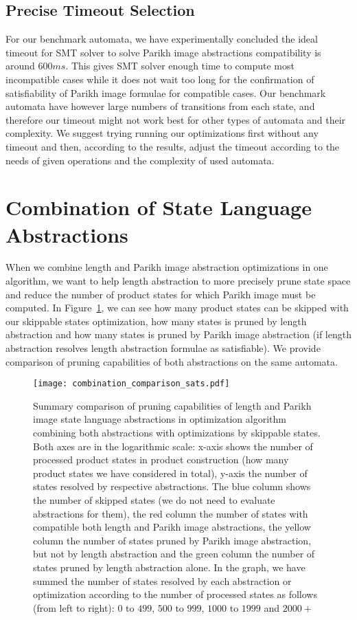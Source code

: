 \subsection{Precise Timeout Selection}

For our benchmark automata, we have experimentally concluded the ideal timeout for SMT solver to solve Parikh image abstractions compatibility is around $600 ms$. This gives SMT solver enough time to compute most incompatible cases while it does not wait too long for the confirmation of satisfiability of Parikh image formulae for compatible cases. Our benchmark automata have however large numbers of transitions from each state, and therefore our timeout might not work best for other types of automata and their complexity. We suggest trying running our optimizations first without any timeout and then, according to the results, adjust the timeout according to the needs of given operations and the complexity of used automata.

\section{Combination of State Language Abstractions}

When we combine length and Parikh image abstraction optimizations in one algorithm, we want to help length abstraction to more precisely prune state space and reduce the number of product states for which Parikh image must be computed. In Figure~\ref{fig:diagram:combined_sat_unsat_comparison}, we can see how many product states can be skipped with our skippable states optimization, how many states is pruned by length abstraction and how many states is pruned by Parikh image abstraction (if length abstraction resolves length abstraction formulae as satisfiable). We provide comparison of pruning capabilities of both abstractions on the same automata.

\begin{figure}[ht]
	\centering
	\texttt{[image: combination\_comparison\_sats.pdf]}
	\caption{Summary comparison of pruning capabilities of length and Parikh image state language abstractions in optimization algorithm combining both abstractions with optimizations by skippable states. Both axes are in the logarithmic scale: x-axis shows the number of processed product states in product construction (how many product states we have considered in total), y-axis the number of states resolved by respective abstractions. The blue column shows the number of skipped states (we do not need to evaluate abstractions for them), the red column the number of states with compatible both length and Parikh image abstractions, the yellow column the number of states pruned by Parikh image abstraction, but not by length abstraction and the green column the number of states pruned by length abstraction alone. In the graph, we have summed the number of states resolved by each abstraction or optimization according to the number of processed states as follows (from left to right): $0$ to $499$, $500$ to $999$, $1000$ to $1999$ and $2000+$ }
	\label{fig:diagram:combined_sat_unsat_comparison}
\end{figure}

